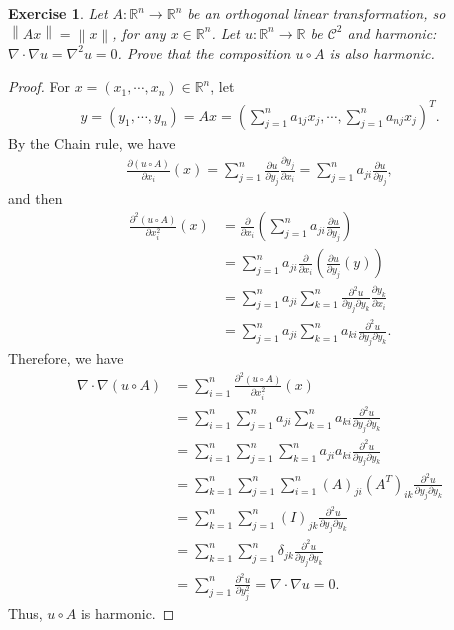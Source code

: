 \documentclass[11pt]{article}
\newtheorem{exercise}{Exercise}[section]
\theoremstyle{definition}
\numberwithin{equation}{subsection}
\begin{document}
\begin{exercise}
Let $A: \mathbb{R}^n \to \mathbb{R}^n$ be an orthogonal linear transformation, so $\left\|Ax \right\| = \left\|x \right\|$, for any $x \in \mathbb{R}^n$. Let $u: \mathbb{R}^n \to \mathbb{R}$ be $\mathcal{C}^2$ and harmonic: $\nabla \cdot \nabla u = \nabla^2 u = 0$. Prove that the composition $u \circ A$ is also harmonic.
\end{exercise}
\begin{proof}
For $x = (x_1, \cdots, x_n) \in \mathbb{R}^n$, let
\begin{align*}
    y = (y_1, \cdots, y_n) = Ax = \left(\sum^n_{j=1} a_{1j}x_j, \cdots, \sum^n_{j=1} a_{nj}x_j \right)^T.
\end{align*}
By the Chain rule, we have
\begin{align*}
    \frac{\partial (u \circ A)}{\partial x_i}(x) = \sum^n_{j=1} \frac{\partial u}{\partial y_j} \frac{\partial y_j}{\partial x_i} = \sum^n_{j=1} a_{ji} \frac{\partial u}{\partial y_j},
\end{align*}
and then 
\begin{align*}
    \frac{\partial^2 (u \circ A)}{\partial x_i^2}(x) & = \frac{\partial}{\partial x_i}\left(\sum^n_{j=1} a_{ji} \frac{\partial u}{\partial y_j} \right) \\
    & = \sum^n_{j=1} a_{ji} \frac{\partial}{\partial x_i}\left(\frac{\partial u}{\partial y_j}(y) \right) \\
    & = \sum^n_{j=1} a_{ji} \sum^n_{k=1} \frac{\partial^2 u}{\partial y_j \partial y_k} \frac{\partial y_k}{\partial x_i} \\
    & = \sum^n_{j=1} a_{ji} \sum^n_{k=1} a_{ki} \frac{\partial^2 u}{\partial y_j \partial y_k}.
\end{align*}
Therefore, we have
\begin{align*}
    \nabla \cdot \nabla (u \circ A) & = \sum^n_{i=1} \frac{\partial^2 (u \circ A)}{\partial x_i^2}(x) \\
    & = \sum^n_{i=1} \sum^n_{j=1} a_{ji} \sum^n_{k=1} a_{ki} \frac{\partial^2 u}{\partial y_j \partial y_k} \\
    & = \sum^n_{i=1} \sum^n_{j=1} \sum^n_{k=1} a_{ji} a_{ki} \frac{\partial^2 u}{\partial y_j \partial y_k} \\
    & = \sum^n_{k=1} \sum^n_{j=1} \sum^n_{i=1} (A)_{ji} \left(A^T\right)_{ik} \frac{\partial^2 u}{\partial y_j \partial y_k} \\
    & = \sum^n_{k=1} \sum^n_{j=1} (I)_{jk} \frac{\partial^2 u}{\partial y_j \partial y_k} \\
    & = \sum^n_{k=1} \sum^n_{j=1} \delta_{jk} \frac{\partial^2 u}{\partial y_j \partial y_k} \\
    & = \sum^n_{j=1} \frac{\partial^2 u}{\partial y_j^2} = \nabla \cdot \nabla u = 0.
\end{align*}
Thus, $u \circ A$ is harmonic.
\end{proof}
\end{document}
